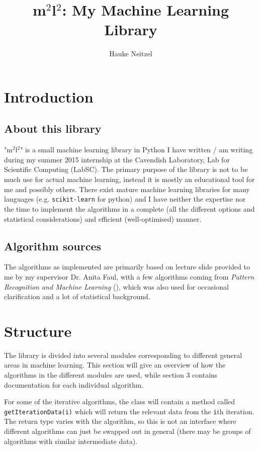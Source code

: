 \documentclass[a4paper, 12pt]{article}
\title{m$^2$l$^2$: My Machine Learning Library}
\author{Hauke Neitzel}
\begin{document}
\maketitle
\newpage

\section{Introduction}
\subsection{About this library}
"m$^2$l$^2$" is a small machine learning library in Python I have written / am writing during my summer 2015 internship at the Cavendish Laboratory, Lab for Scientific Computing (LabSC). The primary purpose of the library is not to be much use for actual machine learning, instead it is mostly an educational tool for me and possibly others. There exist mature machine learning libraries for many languages (e.g. \texttt{scikit-learn} for python) and I have neither the expertise nor the time to implement the algorithms in a complete (all the different options and statistical considerations) and efficient (well-optimised) manner.

\subsection{Algorithm sources}
The algorithms as implemented are primarily based on lecture slide provided to me by my supervisor Dr. Anita Faul, with a few algorithms coming from \textit{Pattern Recognition and Machine Learning} (\cite{PRML}), which was also used for occasional clarification and a lot of statistical background.


\section{Structure}
The library is divided into several modules corresponding to different general areas in machine learning. This section will give an overview of how the algorithms in the different modules are used, while section 3 contains documentation for each individual algorithm.

For some of the iterative algorithms, the class will contain a method called \texttt{getIterationData(i)} which will return the relevant data from the \texttt{i}th iteration. The return type varies with the algorithm, so this is not an interface where different algorithms can just be swapped out in general (there may be groups of algorithms with similar intermediate data).
\end{document}
